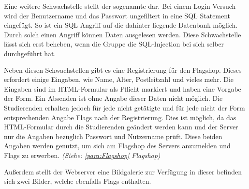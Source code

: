 Eine weitere Schwachstelle stellt der sogenannte  dar. Bei einem Login Versuch wird der Benutzername und das Passwort ungefiltert in eine SQL Statement eingefügt. So ist ein SQL Angriff auf die dahinter liegende Datenbank möglich. Durch solch einen Angriff können Daten ausgelesen werden. Diese Schwachstelle lässt sich erst beheben, wenn die Gruppe die SQL-Injection bei sich selber durchgeführt hat.

Neben diesen Schwachstellen gibt es eine Registrierung für den Flagshop. Dieses erfordert einige Eingaben, wie Name, Alter, Postleitzahl und vieles mehr. Die Eingaben sind im HTML-Formular als Pflicht markiert und haben eine Vorgabe der Form. Ein Absenden ist ohne Angabe dieser Daten nicht möglich. Die Studierenden erhalten jedoch für jede nicht getätigte und für jede nicht der Form entsprechenden Angabe Flags nach der Registrierung. Dies ist möglich, da das HTML-Formular durch die Studierenden geändert werden kann und der Server nur die Angaben bezüglich Passwort und Nutzername prüft. Diese beiden Angaben werden genutzt, um sich am Flagshop des Servers anzumelden und Flags zu erwerben. \textit{(Siehe: \ref{para:Flagshop} Flagshop)}

Außerdem stellt der Webserver eine Bildgalerie zur Verfügung in dieser befinden sich zwei Bilder, welche ebenfalls Flags enthalten.